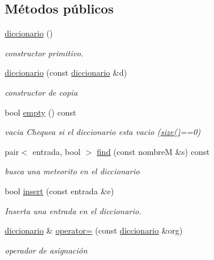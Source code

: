 \subsection*{Métodos públicos}
\begin{DoxyCompactItemize}
\item 
\hyperlink{classdiccionario_a60c722b06ff7e050bae71601f74d7549}{diccionario} ()
\begin{DoxyCompactList}\small\item\em constructor primitivo. \end{DoxyCompactList}\item 
\hyperlink{classdiccionario_a19558e1ad869a8791741b1359c87d80b}{diccionario} (const \hyperlink{classdiccionario}{diccionario} \&d)
\begin{DoxyCompactList}\small\item\em constructor de copia \end{DoxyCompactList}\item 
bool \hyperlink{classdiccionario_a8df27c218ef713041e09c9f799a1e9e6}{empty} () const 
\begin{DoxyCompactList}\small\item\em vacia Chequea si el diccionario esta vacio (\hyperlink{classdiccionario_a441fdeeb87c717757f5f7ff50612d57e}{size()}==0) \end{DoxyCompactList}\item 
pair$<$ entrada, bool $>$ \hyperlink{classdiccionario_a5ce69ac88959ca76c60fe0875690320f}{find} (const nombre\-M \&s) const 
\begin{DoxyCompactList}\small\item\em busca una meteorito en el diccionario \end{DoxyCompactList}\item 
bool \hyperlink{classdiccionario_abda03cfdf5848a07b2d93ebdc1238d27}{insert} (const entrada \&e)
\begin{DoxyCompactList}\small\item\em Inserta una entrada en el diccionario. \end{DoxyCompactList}\item 
\hyperlink{classdiccionario}{diccionario} \& \hyperlink{classdiccionario_af34ed220d3e0faa56cbe713b97766f02}{operator=} (const \hyperlink{classdiccionario}{diccionario} \&org)
\begin{DoxyCompactList}\small\item\em operador de asignación \end{DoxyCompactList}\item 

\end{DoxyCompactItemize}
